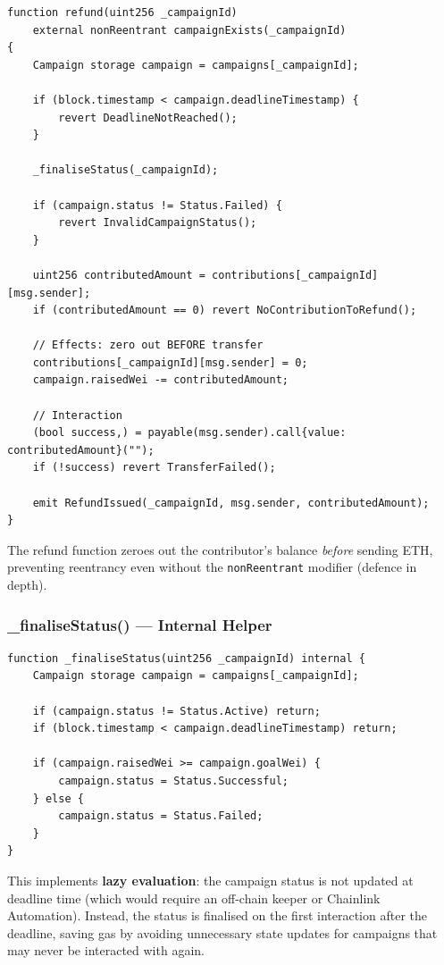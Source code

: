 \begin{lstlisting}[language=Solidity, caption={Refund Logic (CEI Pattern)}]
function refund(uint256 _campaignId)
    external nonReentrant campaignExists(_campaignId)
{
    Campaign storage campaign = campaigns[_campaignId];

    if (block.timestamp < campaign.deadlineTimestamp) {
        revert DeadlineNotReached();
    }

    _finaliseStatus(_campaignId);

    if (campaign.status != Status.Failed) {
        revert InvalidCampaignStatus();
    }

    uint256 contributedAmount = contributions[_campaignId][msg.sender];
    if (contributedAmount == 0) revert NoContributionToRefund();

    // Effects: zero out BEFORE transfer
    contributions[_campaignId][msg.sender] = 0;
    campaign.raisedWei -= contributedAmount;

    // Interaction
    (bool success,) = payable(msg.sender).call{value: contributedAmount}("");
    if (!success) revert TransferFailed();

    emit RefundIssued(_campaignId, msg.sender, contributedAmount);
}
\end{lstlisting}

The refund function zeroes out the contributor's balance \emph{before} sending ETH, preventing reentrancy even without the \texttt{nonReentrant} modifier (defence in depth).

\subsubsection{\_finaliseStatus() --- Internal Helper}

\begin{lstlisting}[language=Solidity, caption={Lazy Status Finalisation}]
function _finaliseStatus(uint256 _campaignId) internal {
    Campaign storage campaign = campaigns[_campaignId];

    if (campaign.status != Status.Active) return;
    if (block.timestamp < campaign.deadlineTimestamp) return;

    if (campaign.raisedWei >= campaign.goalWei) {
        campaign.status = Status.Successful;
    } else {
        campaign.status = Status.Failed;
    }
}
\end{lstlisting}

This implements \textbf{lazy evaluation}: the campaign status is not updated at deadline time (which would require an off-chain keeper or Chainlink Automation). Instead, the status is finalised on the first interaction after the deadline, saving gas by avoiding unnecessary state updates for campaigns that may never be interacted with again.

